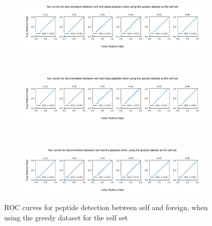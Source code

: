 \documentclass{article}
\begin{document}
\begin{figure}[ht]
    \begin{subfigure}[t]{\linewidth}
        \centering
        \includegraphics[width=\linewidth]{images/ebola_greedy.png}
        \label{fig:ebola_grd}
    \end{subfigure}
    \\
    \begin{subfigure}[t]{\linewidth}
        \centering
        \includegraphics[width=\linewidth]{images/hepb_greedy.png}
        \label{fig:hepb_grd}
    \end{subfigure}
        \\
    \begin{subfigure}[t]{\linewidth}
        \centering
        \includegraphics[width=\linewidth]{images/hiv_greedy.png}
        \label{fig:hiv_grd}
    \end{subfigure}

    \caption{ROC curves for peptide detection between self and foreign, when using the greedy dataset for the self set}
    \label{fig:pept_grd}
\end{figure}
\end{document}
